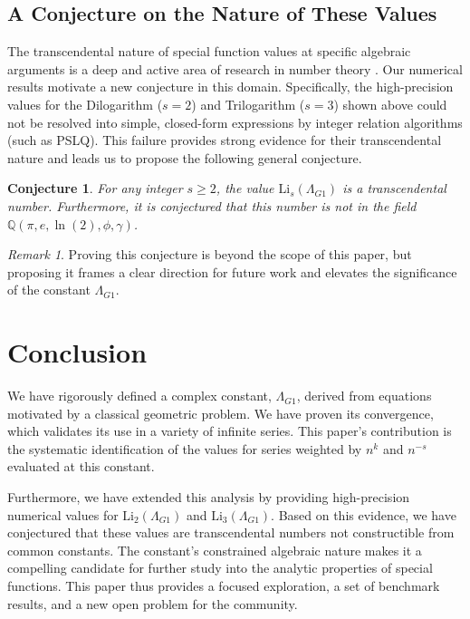 \documentclass{amsart}
\theoremstyle{plain}
\newtheorem{conjecture}[theorem]{Conjecture}
\theoremstyle{definition}
\theoremstyle{remark}
\newtheorem*{remark}{Remark}
\newcommand{\LambdaG}{\Lambda_{G1}}
\begin{document}
\subsection{A Conjecture on the Nature of These Values}
The transcendental nature of special function values at specific algebraic arguments is a deep and active area of research in number theory \cite{Lewin}. Our numerical results motivate a new conjecture in this domain. Specifically, the high-precision values for the Dilogarithm ($s=2$) and Trilogarithm ($s=3$) shown above could not be resolved into simple, closed-form expressions by integer relation algorithms (such as PSLQ). This failure provides strong evidence for their transcendental nature and leads us to propose the following general conjecture.

\begin{conjecture}
For any integer $s \ge 2$, the value $\mathrm{Li}_s(\LambdaG)$ is a transcendental number. Furthermore, it is conjectured that this number is not in the field $\mathbb{Q}(\pi, e, \ln(2), \phi, \gamma)$.
\end{conjecture}
\begin{remark}
Proving this conjecture is beyond the scope of this paper, but proposing it frames a clear direction for future work and elevates the significance of the constant $\LambdaG$.
\end{remark}

\section{Conclusion}
We have rigorously defined a complex constant, $\LambdaG$, derived from equations motivated by a classical geometric problem. We have proven its convergence, which validates its use in a variety of infinite series. This paper's contribution is the systematic identification of the values for series weighted by $n^k$ and $n^{-s}$ evaluated at this constant.

Furthermore, we have extended this analysis by providing high-precision numerical values for $\mathrm{Li}_2(\LambdaG)$ and $\mathrm{Li}_3(\LambdaG)$. Based on this evidence, we have conjectured that these values are transcendental numbers not constructible from common constants. The constant's constrained algebraic nature makes it a compelling candidate for further study into the analytic properties of special functions. This paper thus provides a focused exploration, a set of benchmark results, and a new open problem for the community.
\end{document}
